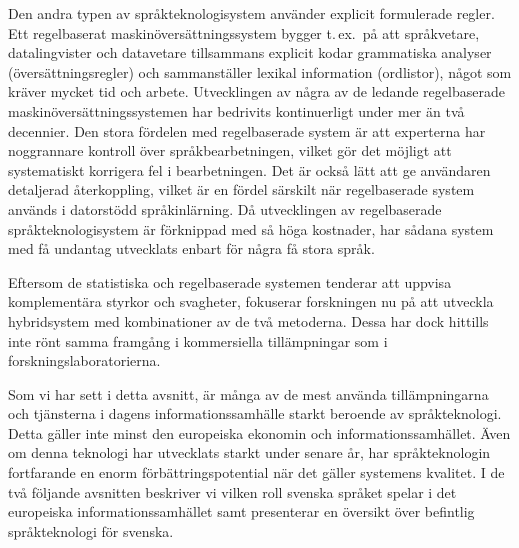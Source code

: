 \begin{multicols}{2}
Den andra typen av språkteknologisystem använder explicit formulerade
regler. Ett regelbaserat maskin\-över\-sätt\-nings\-system bygger
t.\,ex.~på att språkvetare, datalingvister och datavetare tillsammans
explicit kodar grammatiska analyser (översättningsregler) och
sammanställer lexikal information (ordlistor), något som kräver mycket
tid och arbete. Utvecklingen av några av de ledande regelbaserade
maskin\-över\-sätt\-ningssystemen har bedrivits kontinuerligt under mer än
två decennier. Den stora fördelen med regelbaserade system är att
experterna har noggrannare kontroll över språkbearbetningen, vilket
gör det möjligt att systematiskt korrigera fel i bearbetningen. Det är
också lätt att ge användaren detaljerad återkoppling, vilket är en
fördel särskilt när regelbaserade system används i datorstödd
språkinlärning. Då utvecklingen av regelbaserade
språkteknologisystem är förknippad med så höga kostnader, har sådana
system med få undantag utvecklats enbart för några få stora språk.

Eftersom de statistiska och regelbaserade systemen tenderar att
uppvisa komplementära styrkor och svagheter, fokuserar forskningen nu
på att utveckla hybridsystem med kombinationer av de två
metoderna. Dessa har dock hittills inte rönt samma framgång i
kommersiella tillämpningar som i forskningslaboratorierna.


Som vi har sett i detta avsnitt, är många av de mest använda
tillämpningarna och tjänsterna i dagens informationssamhälle starkt
beroende av språkteknologi. Detta gäller inte minst den europeiska
ekonomin och informationssamhället. Även om denna teknologi har
utvecklats starkt under senare år, har språkteknologin fortfarande en
enorm förbättringspotential när det gäller sys\-tem\-ens kvalitet. I de
två följande avsnitten beskriver vi vilken roll svenska språket spelar
i det europeiska informationssamhället samt presenterar en översikt
över befintlig språkteknologi för svenska.


\end{multicols}

\clearpage



